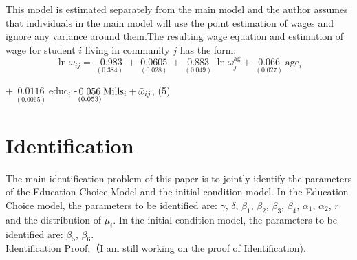 \documentclass{handoutForSolutions}
\begin{document}
This model is estimated separately from the main model and the author assumes that individuals in the main model will use the point estimation of wages and ignore any variance around them.The resulting wage equation and estimation of wage for student $i$ living in community $j$ has the form:
$$
\ln\omega_{ij}=\mathop{-0.983}\limits_{(0.384)}+\mathop{0.0605P_{j}}\limits_{(0.028)}+\mathop{0.883}\limits_{(0.049)}\ln\omega^{\mathrm{a}\mathrm{g}}_j+\mathop{0.066}\limits_{(0.027)}\mathrm{a}\mathrm{g}\mathrm{e}_{i}
$$
\begin{center}
$+\mathop{0.0116}\limits_{(0.0065)}$$\mathrm{educ}_i$ -$\mathop{0.056}\limits_{(0.053)}\mathrm{M}\mathrm{i}\mathrm{l}\mathrm{l}\mathrm{s}_{i}+\Bar{\omega}_{ij}$,   (5)
\end{center}

\newpage
\section{Identification}
The main identification problem of this paper is to jointly identify the parameters of the Education Choice Model and the initial condition model. In the Education Choice model, the parameters to be identified are: $\gamma$, $\delta$, $\beta_1$, $\beta_2$, $\beta_3$, $\beta_4$, $\alpha_1$, $\alpha_2$, $r$ and the distribution of $\mu_i$. In the initial condition model, the parameters to be identified are: $\beta_5$, $\beta_6$.\\

Identification Proof:（I am still working on the proof of Identification).
\end{document}
